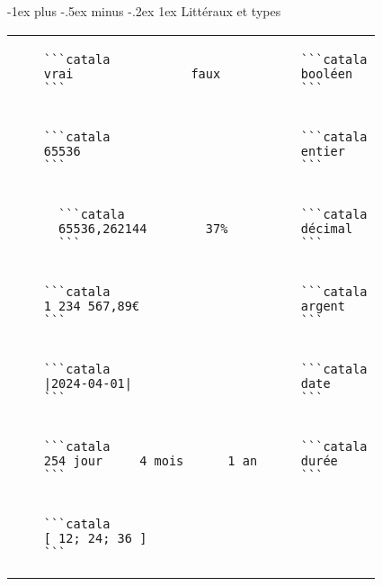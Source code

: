 \documentclass{article}
\makeatletter
\newcommand\articlenormalsize{\fontsize{10pt}{12pt}\selectfont}
\renewcommand{\section}{\@startsection{section}{1}{0mm}%
                                {-1ex plus -.5ex minus -.2ex}%
                                {1ex}%
                                {\normalfont\articlenormalsize\bfseries}}
\newenvironment{catala}{%
  \VerbatimEnvironment
  \let\FV@ListVSpace\relax
  \begin{verbatim}}%
 {\end{verbatim}}
\makeatother
\begin{document}
\begin{multicols}{3}
\section{Littéraux et types}

\begin{tabular}{@{}p{\cola}p{\colb}@{}}
  
  \begin{catala}
    ```catala
    vrai                faux
    ```
  \end{catala}
  & \begin{catala}
    ```catala
    booléen
    ```
  \end{catala}
  \\
  \begin{catala}
    ```catala
    65536
    ```
  \end{catala}
  & \begin{catala}
    ```catala
    entier
    ```
  \end{catala}
  \\
  \begin{catala}
      ```catala
      65536,262144        37%
      ```
    \end{catala}
  & \begin{catala}
    ```catala
    décimal
    ```
  \end{catala}
  \\
  \begin{catala}
    ```catala
    1 234 567,89€
    ```
  \end{catala}
  & \begin{catala}
    ```catala
    argent
    ```
  \end{catala}
  \\
  \begin{catala}
    ```catala
    |2024-04-01|
    ```
  \end{catala}
  & \begin{catala}
    ```catala
    date
    ```
  \end{catala}
  \\
  \begin{catala}
    ```catala
    254 jour     4 mois      1 an
    ```
  \end{catala}
  & \begin{catala}
    ```catala
    durée
    ```
  \end{catala}
  \\
  \begin{catala}
    ```catala
    [ 12; 24; 36 ]
    ```
  \end{catala}

\end{tabular}
\end{multicols}
\end{document}
